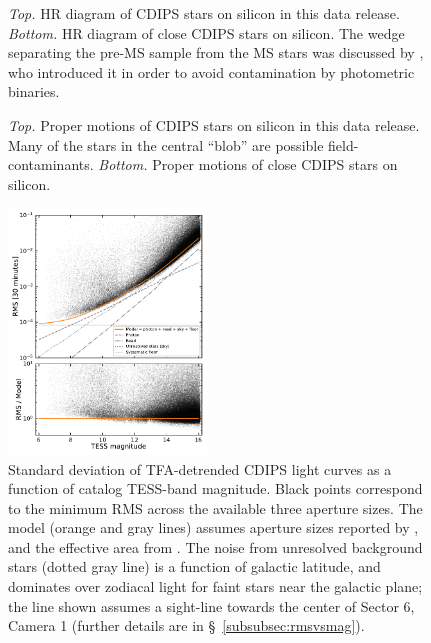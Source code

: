 \documentclass[12pt,twocolumn,tighten]{aastex62}
\begin{document}
\begin{figure}[!ht]
	\vspace{-0.8cm}
	\vspace{-0.8cm}
	\caption{
		{\it Top.} HR diagram of CDIPS stars on silicon in this
		data release.  {\it Bottom.} HR diagram of close CDIPS stars on
		silicon. The wedge separating the pre-MS sample from the MS
		stars was discussed by \citet{zari_3d_2018}, who introduced it in
		order to avoid contamination by photometric binaries.
	}
	\label{fig:hrd}
\end{figure}

\begin{figure}[!t]
	\vspace{-0.8cm}
	\vspace{-0.8cm}
	\caption{
		{\it Top.} Proper motions of CDIPS stars on silicon in this
		data release.  Many of the stars in the central ``blob'' are possible
		field-contaminants.
		{\it Bottom.} Proper motions of close CDIPS stars
		on silicon.
	}
	\label{fig:propermotions}
\end{figure}

\begin{figure}[!t]
	\begin{center}
		\leavevmode
		\includegraphics[width=0.47\textwidth]{rms_vs_mag.pdf}
	\end{center}
	\vspace{-0.5cm}
	\caption{
    Standard deviation of TFA-detrended CDIPS light curves as a
    function of catalog TESS-band magnitude.  Black points correspond
    to the minimum RMS across the available three aperture sizes.  The
    model (orange and gray lines) assumes aperture sizes reported by
    \citet{Sullivan_et_al_2015}, and the effective area from
    \citet{vanderspek_2018}.  The noise from unresolved background
    stars (dotted gray line) is a function of galactic latitude, and
    dominates over zodiacal light for faint stars near the galactic
    plane; the line shown assumes a sight-line towards the center of
    Sector 6, Camera 1 (further details are in
    \S~\ref{subsubsec:rmsvsmag}).
		\label{fig:rms_vs_mag}
	}
\end{figure}
\end{document}
